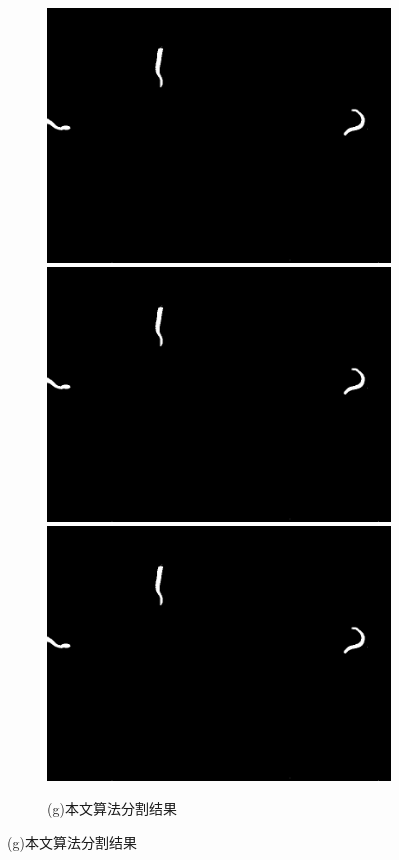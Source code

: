 \begin{figure}[!htp]
	  \begin{subfigure}{\linewidth}
		\centering
		\begin{minipage}[b]{\linewidth}
		\includegraphics[width=0.33\linewidth,natwidth=800,natheight=600]{figure/chap3/test1/441.orgin.1051.jpg}
		\includegraphics[width=0.33\linewidth,natwidth=800,natheight=600]{figure/chap3/test1/441.orgin.1051.jpg}
		\includegraphics[width=0.33\linewidth,natwidth=800,natheight=600]{figure/chap3/test1/441.orgin.1051.jpg}
		\end{minipage}
		\caption*{(g)本文算法分割结果}
	  \end{subfigure}
	  \label{fig:comp_res}
\end{figure}
